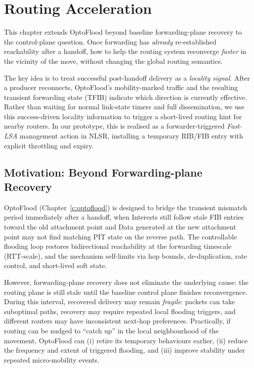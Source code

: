 \chapter{Routing Acceleration}
\label{c:routingacc}

This chapter extends OptoFlood beyond baseline forwarding-plane recovery to the
control-plane question. Once forwarding has \emph{already} re-established reachability after a handoff, how to help the routing system reconverge \emph{faster} in the vicinity of the move, without changing the global routing semantics.

The key idea is to treat successful post-handoff delivery as a \emph{locality signal}. After a producer reconnects, OptoFlood’s mobility-marked traffic and the resulting transient forwarding state (TFIB) indicate which direction is currently effective. Rather than waiting for normal link-state timers and full dissemination, we use this success-driven locality information to trigger a short-lived routing hint for nearby routers. In our prototype, this is realised as a forwarder-triggered \emph{Fast-LSA} management action in NLSR, installing a temporary RIB/FIB entry with explicit throttling and expiry.

\section{Motivation: Beyond Forwarding-plane Recovery}
\label{sec:routingacc:motivation}

OptoFlood (Chapter~\ref{c:optoflood}) is designed to bridge the transient mismatch period immediately after a handoff, when Interests still follow stale FIB entries toward the old attachment point and Data generated at the new attachment point may not find matching PIT state on the reverse path. The controllable flooding loop restores bidirectional reachability at the forwarding timescale (RTT-scale), and the mechanism self-limits via hop bounds, de-duplication, rate control, and short-lived soft state.

However, forwarding-plane recovery does not eliminate the underlying cause: the routing plane is still stale until the baseline control plane finishes reconvergence. During this interval, recovered delivery may remain \emph{fragile}: packets can take suboptimal paths, recovery may require repeated local flooding triggers, and different routers may have inconsistent next-hop preferences. Practically, if routing can be nudged to “catch up” in the local neighbourhood of the movement, OptoFlood can (i) retire its temporary behaviours earlier, (ii) reduce the frequency and extent of triggered flooding, and (iii) improve stability under repeated micro-mobility events.

